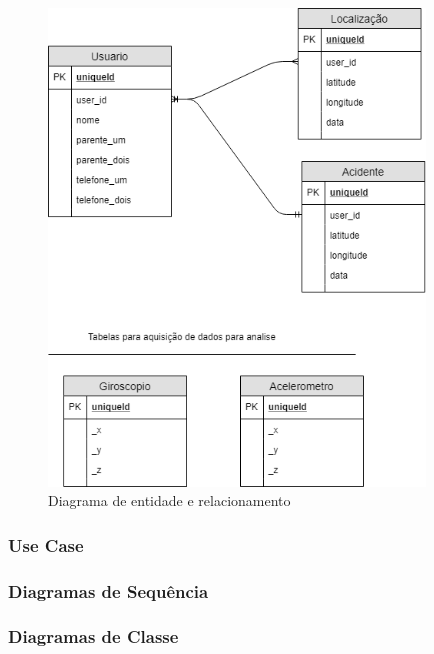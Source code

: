 \begin{figure}[H]

 \caption{Diagrama de entidade e relacionamento}
 \centering
  \includegraphics[width=100mm]{images/Cap3/Diagrama_ER_f.png}
  
    
\end{figure}




\subsubsection{Use Case}
\subsubsection{Diagramas de Sequência}
\subsubsection{Diagramas de Classe}

